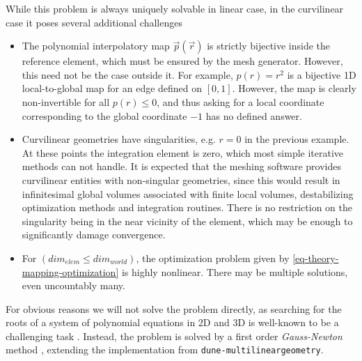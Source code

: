 \noindent
While this problem is always uniquely solvable in linear case, in the curvilinear case it poses several additional challenges
\begin{itemize}
	\item The polynomial interpolatory map $\vec{p}(\vec{r})$ is strictly bijective inside the reference element, which must be ensured by the mesh generator. However, this need not be the case outside it. For example, $p(r) = r^2$ is a bijective 1D local-to-global map for an edge defined on $[0,1]$. However, the map is clearly non-invertible for all $p(r) \leq 0$, and thus asking for a local coordinate corresponding to the global coordinate $-1$ has no defined answer.
	\item Curvilinear geometries have singularities, e.g. $r = 0$ in the previous example. At these points the integration element is zero, which most simple iterative methods can not handle. It is expected that the meshing software provides curvilinear entities with non-singular geometries, since this would result in infinitesimal global volumes associated with finite local volumes, destabilizing optimization methods and integration routines. There is no restriction on the singularity being in the near vicinity of the element, which may be enough to significantly damage convergence.
	\item For $(dim_{elem} \leq dim_{world})$, the optimization problem given by \cref{eq-theory-mapping-optimization} is highly nonlinear. There may be multiple solutions, even uncountably many.
\end{itemize}

\noindent
For obvious reasons we will not solve the problem directly, as searching for the roots of a system of polynomial equations in 2D and 3D is well-known to be a challenging task \cite{canny+1989}. Instead, the problem is solved by a first order \textit{Gauss-Newton} method \cite{bjoerck+1996}, extending the implementation from \texttt{dune-multilineargeometry}.

